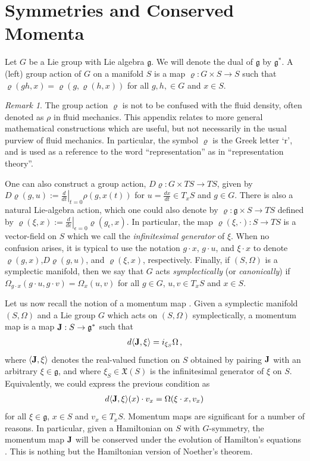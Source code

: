 \documentclass[12pt]{amsart}
\theoremstyle{remark}
\newtheorem{rmk}[thm]{Remark}
\begin{document}
\section{Symmetries and Conserved Momenta}
\label{sec:symmetries}
Let $G$ be a Lie group with Lie algebra $\mathfrak{g}$.
We will denote the dual of $\mathfrak{g}$ by $\mathfrak{g}^*$.
A (left) group action of $G$ on a manifold $S$ is a map $\varrho: G \times S \to S$
such that $\varrho( g h , x) = \varrho(g , \varrho(h , x))$ for all $g,h, \in G$ and $x \in S$.
\begin{rmk}
The group action $\varrho$ is not to be confused with the fluid density, often denoted as $\rho$ in fluid mechanics.
This appendix relates to more general mathematical constructions which are useful, but not necessarily in the usual purview of fluid mechanics.
In particular, the symbol $\varrho$ is the Greek letter `r', and is used as a reference to the word ``representation''
as in ``representation theory''.
\end{rmk}
One can also construct a group action, $D\varrho: G \times TS \to TS$,  given by
$D\varrho( g , u ) := \left.\frac{d}{dt}\right|_{t=0} \rho(g, x(t) )$ for $u = \frac{dx}{dt} \in T_x S$ and $g \in G$.
There is also a natural Lie-algebra action, which one could also denote by $\varrho: \mathfrak{g} \times S \to TS$
defined by $\varrho( \xi , x) := \left. \frac{d}{d \epsilon} \right|_{\epsilon =0} \varrho( g_\epsilon , x)$.
In particular, the map $\varrho( \xi , \cdot ) : S \to TS$ is a vector-field on $S$ which we call the
\emph{infinitesimal generator} of $\xi$.
When no confusion arises, it is typical to use the notation $g \cdot x$, $g \cdot u$, and $\xi \cdot x$ to denote $\varrho(g,x)$,$D\varrho(g,u)$,  and $\varrho(\xi,x)$, respectively.
Finally, if $(S,\Omega)$ is a symplectic manifold, then we say that $G$ acts \emph{symplectically} (or \emph{canonically})
if $\Omega_{g \cdot x}( g \cdot u , g \cdot v) = \Omega_x(u,v)$ for all $g \in G$, $u,v \in T_x S$ and $x \in S$.

Let us now recall the notion of a momentum map \cite[Definition 4.2.1]{FOM}.
Given a symplectic manifold $(S,\Omega)$ and a Lie group $G$ which acts on $(S,\Omega)$ symplectically, a momentum map is a map ${\bf J}:S \to \mathfrak{g}^*$ such that
\begin{align*}
  d \langle {\bf J} , \xi \rangle = i_{\xi_S} \Omega\,,
\end{align*}
where $\langle {\bf J} , \xi \rangle$ denotes the real-valued function on $S$ obtained by pairing ${\bf J}$ with an arbitrary
 $\xi \in \mathfrak{g}$, and where $\xi_S \in \mathfrak{X}(S)$ is the infinitesimal generator of $\xi$ on $S$.
Equivalently, we could express the previous condition as
\begin{align}
  d \langle {\bf J},\xi \rangle(x) \cdot v_x = \Omega( \xi\cdot x , v_x ) \label{eq:momap}
\end{align}
for all $\xi \in \mathfrak{g}$, $x \in S$ and $v_x \in T_xS$.
Momentum maps are significant for a number of reasons.
In particular, given a Hamiltonian on $S$ with $G$-symmetry, the momentum map ${\bf J}$ will be conserved under the evolution of
Hamilton's equations \cite[Theorem 4.2.2]{FOM}.
This is nothing but the Hamiltonian version of Noether's theorem.
\end{document}
